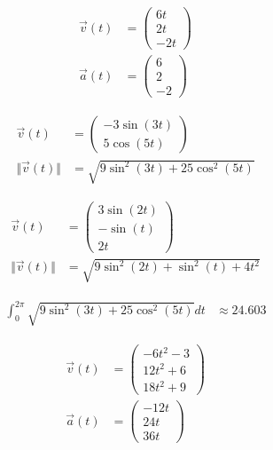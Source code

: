 \documentclass[8pt]{extarticle}
\begin{document}
  \begin{problem}{17.2}
    \begin{description}[font=\normalfont]
      \item[2:]
        \begin{align*}
          \vec{v}(t) &= \begin{pmatrix}6t\\2t\\-2t\end{pmatrix}\\
          \vec{a}(t) &= \begin{pmatrix}6\\2\\-2\end{pmatrix}
        \end{align*}
      \item[8:]
        \begin{align*}
          \vec{v}(t) &= \begin{pmatrix}-3\sin(3t)\\5\cos(5t)\end{pmatrix}\\
          \Vert\vec{v}(t)\Vert &= \sqrt{9\sin^2(3t) + 25\cos^2(5t)}
        \end{align*}
      \item[12:]
        \begin{align*}
          \vec{v}(t) &= \begin{pmatrix}3\sin(2t)\\-\sin(t)\\2t\end{pmatrix}\\
          \Vert\vec{v}(t)\Vert &= \sqrt{9\sin^2(2t) + \sin^2(t) + 4t^2}
        \end{align*}
      \item[14:]
        \begin{align*}
          \int_{0}^{2\pi}\sqrt{9\sin^2(3t) + 25\cos^2(5t)}dt &\approx 24.603
        \end{align*}
      \item[20:]
        \begin{align*}
          \vec{v}(t) &= \begin{pmatrix}-6t^2-3\\12t^2+6\\18t^2 + 9\end{pmatrix}\\
          \vec{a}(t) &= \begin{pmatrix}-12t\\24t\\36t\end{pmatrix}

\end{align*}
\end{description}
\end{problem}
\end{document}
